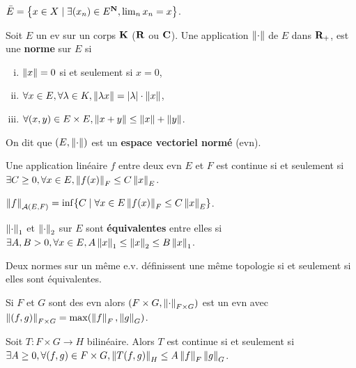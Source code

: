 \begin{pop}
	$\bar{E} = \left\{ x \in X \mid \exists (x_n) \in E^{\mathbf{N}}, \lim_n x_n = x \right\}$.
\end{pop}

\begin{defn}
	Soit $E$ un ev sur un corps $\mathbf{K}$ ($\mathbf{R}$ ou $\mathbf{C}$).
	Une application $\left\lVert\cdot\right\rVert$ de $E$ dans $\mathbf{R}_+$, est une \textbf{norme} sur $E$ si
	\begin{enumerate}[(i)]
		\item $\left\lVert x\right\rVert = 0$ si et seulement si $x = 0$,
		\item $\forall x \in E, \forall \lambda \in K, \left\lVert\lambda x\right\rVert = \left\lvert\lambda\right\rvert \cdot \left\lVert x\right\rVert$,
		\item $\forall (x,y) \in E \times E, \left\lVert x + y\right\rVert \leq \left\lVert x\right\rVert + \left\lVert y\right\rVert$.
	\end{enumerate}
	On dit que $(E,\left\lVert\cdot\right\rVert)$ est un \textbf{espace vectoriel normé} (evn).
\end{defn}

\begin{thm}
	Une application linéaire $f$ entre deux evn $E$ et $F$ est continue si et seulement si $\exists C \geq 0, \forall x \in E, \left\lVert f(x)\right\rVert_F \leq C \left\lVert x\right\rVert_E$.
\end{thm}

\begin{defn}
	$\left\lVert f\right\rVert_{\mathcal{A}(E,F)} = \inf \{ C \mid \forall x \in E \left\lVert f(x)\right\rVert_F \leq C \left\lVert x\right\rVert_E \}$.
\end{defn}

\begin{defn}
	$\left\lVert\cdot\right\rVert_1$ et $\left\lVert\cdot\right\rVert_2$ sur $E$ sont \textbf{équivalentes} entre elles si $\exists A,B > 0, \forall x \in E, A \left\lVert x\right\rVert_1 \leq \left\lVert x\right\rVert_2 \leq B \left\lVert x\right\rVert_1$.
\end{defn}

\begin{pop}
	Deux normes sur un même e.v. définissent une même topologie si et seulement si elles sont équivalentes.
\end{pop}

\begin{defn}
	Si $F$ et $G$ sont des evn alors $(F \times G, \left\lVert\cdot\right\rVert_{F \times G})$ est un evn avec $\left\lVert(f,g)\right\rVert_{F \times G} = \max (\left\lVert f\right\rVert_F,\left\lVert g\right\rVert_G)$.
\end{defn}

\begin{thm}
	Soit $T \colon F \times G \to H$ bilinéaire. Alors $T$ est continue si et seulement si $\exists A \geq 0, \forall (f,g) \in F \times G, \left\lVert T(f,g)\right\rVert_H \leq A \left\lVert f\right\rVert_F \left\lVert g\right\rVert_G$.
\end{thm}

